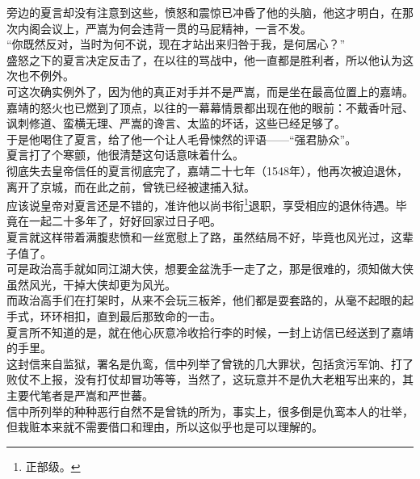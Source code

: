 \begin{multicols}{\theparacolNo}
旁边的夏言却没有注意到这些，愤怒和震惊已冲昏了他的头脑，他这才明白，在那次内阁会议上，严嵩为何会违背一贯的马屁精神，一言不发。\\

“你既然反对，当时为何不说，现在才站出来归咎于我，是何居心？”\\

盛怒之下的夏言决定反击了，在以往的骂战中，他一直都是胜利者，所以他认为这次也不例外。\\

可这次确实例外了，因为他的真正对手并不是严嵩，而是坐在最高位置上的嘉靖。\\

嘉靖的怒火也已燃到了顶点，以往的一幕幕情景都出现在他的眼前：不戴香叶冠、讽刺修道、蛮横无理、严嵩的谗言、太监的坏话，这些已经足够了。\\

于是他喝住了夏言，给了他一个让人毛骨悚然的评语——“强君胁众”。\\

夏言打了个寒颤，他很清楚这句话意味着什么。\\

彻底失去皇帝信任的夏言彻底完了，嘉靖二十七年（1548年），他再次被迫退休，离开了京城，而在此之前，曾铣已经被逮捕入狱。\\

应该说皇帝对夏言还是不错的，准许他以尚书衔\footnote{正部级。}退职，享受相应的退休待遇。毕竟在一起二十多年了，好好回家过日子吧。\\

夏言就这样带着满腹悲愤和一丝宽慰上了路，虽然结局不好，毕竟也风光过，这辈子值了。\\

可是政治高手就如同江湖大侠，想要金盆洗手一走了之，那是很难的，须知做大侠虽然风光，干掉大侠却更为风光。\\

而政治高手们在打架时，从来不会玩三板斧，他们都是耍套路的，从毫不起眼的起手式，环环相扣，直到最后那致命的一击。\\

夏言所不知道的是，就在他心灰意冷收拾行李的时候，一封上访信已经送到了嘉靖的手里。\\

这封信来自监狱，署名是仇鸾，信中列举了曾铣的几大罪状，包括贪污军饷、打了败仗不上报，没有打仗却冒功等等，当然了，这玩意并不是仇大老粗写出来的，其主要代笔者是严嵩和严世蕃。\\

信中所列举的种种恶行自然不是曾铣的所为，事实上，很多倒是仇鸾本人的壮举，但栽赃本来就不需要借口和理由，所以这似乎也是可以理解的。\\


\end{multicols}
